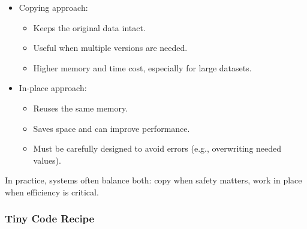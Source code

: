 \documentclass[
  letterpaper,
  DIV=11,
  numbers=noendperiod]{scrreprt}
\providecommand{\tightlist}{%
  \setlength{\itemsep}{0pt}\setlength{\parskip}{0pt}}
\begin{document}
\begin{itemize}
\item
  Copying approach:

  \begin{itemize}
  \tightlist
  \item
    Keeps the original data intact.
  \item
    Useful when multiple versions are needed.
  \item
    Higher memory and time cost, especially for large datasets.
  \end{itemize}
\item
  In-place approach:

  \begin{itemize}
  \tightlist
  \item
    Reuses the same memory.
  \item
    Saves space and can improve performance.
  \item
    Must be carefully designed to avoid errors (e.g., overwriting needed
    values).
  \end{itemize}
\end{itemize}

In practice, systems often balance both: copy when safety matters, work
in place when efficiency is critical.

\subsubsection{Tiny Code Recipe}\label{tiny-code-recipe-77}
\end{document}
